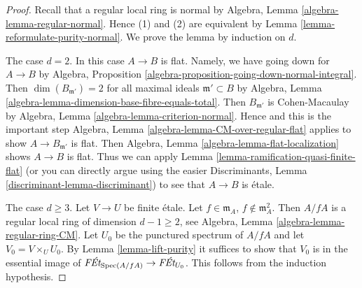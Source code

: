 \begin{proof}
Recall that a regular local ring is normal by
Algebra, Lemma \ref{algebra-lemma-regular-normal}.
Hence (1) and (2) are equivalent by
Lemma \ref{lemma-reformulate-purity-normal}.
We prove the lemma by induction on $d$.

\medskip\noindent
The case $d = 2$. In this case $A \to B$ is flat.
Namely, we have going down for $A \to B$ by
Algebra, Proposition \ref{algebra-proposition-going-down-normal-integral}.
Then $\dim(B_{\mathfrak m'}) = 2$ for all maximal ideals
$\mathfrak m' \subset B$ by
Algebra, Lemma \ref{algebra-lemma-dimension-base-fibre-equals-total}.
Then $B_{\mathfrak m'}$ is Cohen-Macaulay by
Algebra, Lemma \ref{algebra-lemma-criterion-normal}.
Hence and this is the important step
Algebra, Lemma \ref{algebra-lemma-CM-over-regular-flat}
applies to show $A \to B_{\mathfrak m'}$ is flat.
Then Algebra, Lemma \ref{algebra-lemma-flat-localization}
shows $A \to B$ is flat. Thus we can apply
Lemma \ref{lemma-ramification-quasi-finite-flat}
(or you can directly argue using the easier
Discriminants, Lemma \ref{discriminant-lemma-discriminant})
to see that $A \to B$ is \'etale.

\medskip\noindent
The case $d \geq 3$. Let $V \to U$ be finite \'etale.
Let $f \in \mathfrak m_A$, $f \not \in \mathfrak m_A^2$.
Then $A/fA$ is a regular local ring of dimension $d - 1 \geq 2$, see
Algebra, Lemma \ref{algebra-lemma-regular-ring-CM}.
Let $U_0$ be the punctured spectrum of $A/fA$ and let
$V_0 = V \times_U U_0$.
By Lemma \ref{lemma-lift-purity}
it suffices to show that $V_0$ is in the essential
image of $\textit{F\'Et}_{\mathop{\mathrm{Spec}}(A/fA)} \to \textit{F\'Et}_{U_0}$.
This follows from the induction hypothesis.
\end{proof}

